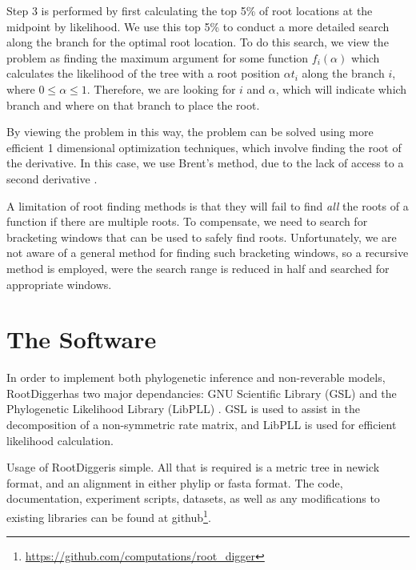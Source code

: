 \documentclass{article}
\newcommand{\RootDigger}{RootDigger}
\begin{document}
Step 3 is performed by first calculating the top 5\% of root locations at the
midpoint by likelihood. We use this top 5\% to conduct a more detailed search
along the branch for the optimal root location. To do this search, we view the
problem as finding the maximum argument for some function $f_i(\alpha)$ which
calculates the likelihood of the tree with a root position $\alpha t_i$ along
the branch $i$, where $0 \leq \alpha \leq 1$. Therefore, we are looking for $i$
and $\alpha$, which will indicate which branch and where on that branch to place
the root.

By viewing the problem in this way, the problem can be solved using more
efficient 1 dimensional optimization techniques, which involve finding the root
of the derivative. In this case, we use Brent's method, due to the lack of
access to a second derivative \footnotemark.


A limitation of root finding methods is that they will fail to find {\it all} the
roots of a function if there are multiple roots. To compensate, we need to
search for bracketing windows that can be used to safely find roots.
Unfortunately, we are not aware of a general method for finding such bracketing
windows, so a recursive method is employed, were the search range is reduced in
half and searched for appropriate \footnotemark windows.


\section{The Software}

In order to implement both phylogenetic inference and non-reverable models,
\RootDigger has two major dependancies: GNU Scientific Library (GSL)
\cite{gough_gnu_2009} and the Phylogenetic Likelihood Library (LibPLL)
\cite{flouri_phylogenetic_2015}. GSL is used to assist in the decomposition of a
non-symmetric rate matrix, and LibPLL is used for efficient likelihood
calculation.

Usage of \RootDigger is simple. All that is required is a metric tree in newick
format, and an alignment in either phylip or fasta format. The code,
documentation, experiment scripts, datasets, as well as any modifications to existing
libraries can be found at
github\footnote{\url{https://github.com/computations/root_digger}}.
\end{document}
